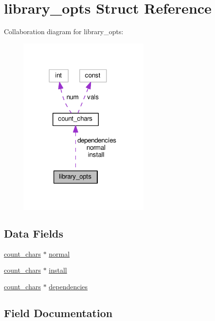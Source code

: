 \hypertarget{structlibrary__opts}{}\section{library\+\_\+opts Struct Reference}
\label{structlibrary__opts}


Collaboration diagram for library\+\_\+opts\+:
\nopagebreak
\begin{figure}[H]
\begin{center}
\leavevmode
\includegraphics[width=185pt]{structlibrary__opts__coll__graph}
\end{center}
\end{figure}
\subsection*{Data Fields}
\begin{DoxyCompactItemize}
\item 
\hyperlink{structcount__chars}{count\+\_\+chars} $\ast$ \hyperlink{structlibrary__opts_ad3503036347d561d385275741e4799fe}{normal}
\item 
\hyperlink{structcount__chars}{count\+\_\+chars} $\ast$ \hyperlink{structlibrary__opts_acbd8063828e6e9688ab0bb8d84c2c2f1}{install}
\item 
\hyperlink{structcount__chars}{count\+\_\+chars} $\ast$ \hyperlink{structlibrary__opts_a6c2bbecd5e4f75d14e7892eda54843c9}{dependencies}
\end{DoxyCompactItemize}


\subsection{Field Documentation}
